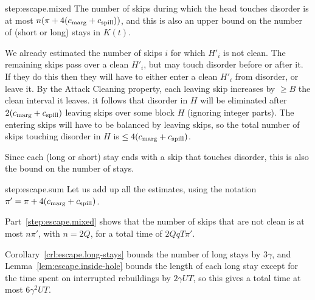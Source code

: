 \documentclass[11pt]{memoir}
\theoremstyle{definition} %
\renewcommand{\le}{\leq}
\renewcommand{\ge}{\geq}
\def\B{B}
\def\U{U}
\renewcommand{\d}{d}
\newcommand{\escno}{q}
\newcommand{\passno}{\pi}
\newcommand{\Q}{Q} %
\newcommand{\Tu}{T}
\newcommand{\cns}[1]{c_{\textrm{\upshape #1}}}
\newcommand{\CMarg}{\cns{marg}}
\newcommand{\CSpill}{\cns{spill}}
\begin{document}
\begin{Proof}

\begin{step+}{step:escape.mixed}
  The number of skips during which the head touches disorder is at most
  \( n(\passno + 4(\CMarg+\CSpill)) \), and this is also an upper bound on the
  number of (short or long) stays in \( K(t) \).
\end{step+}
\begin{pproof}
  We already estimated the number of skips \( i \) for which \( H'_{i} \)
  is not clean.
  The remaining skips pass over a clean \( H'_{i} \), but may touch disorder before
  or after it.
  If they do this then they will have to either enter a clean \( H'_{i} \) from disorder,
  or leave it.
  By the Attack Cleaning property, each leaving skip increases by \( \ge\B \) the clean interval
  it leaves.
  it follows that disorder in \( H \) will be eliminated after \( 2(\CMarg+\CSpill) \)
  leaving skips over some block \( H \) (ignoring integer parts).
  The entering skips will have to be balanced by leaving skips,
  so the total number of skips touching disorder in \( H \) is \( \le 4(\CMarg+\CSpill) \).

  Since each (long or short) stay ends with a skip that touches disorder, this is also the bound
  on the number of stays.
\end{pproof} %

\begin{step+}{step:escape.sum}
Let us add up all the estimates, using the notation \( \passno'=\passno+4(\CMarg+\CSpill) \).
\end{step+}
\begin{prooof}
  Part~\ref {step:escape.mixed} shows that the number of skips
  that are not clean is at most   \( n\passno' \), with \( n=2\Q \),
  for a total time of \(   2\Q\escno\Tu\passno' \).
  
  Corollary~\ref{crl:escape.long-stays} bounds the number of long stays by \( 3\gamma \),
  and Lemma~\ref{lem:escape.inside-hole} bounds the length
  of each long stay except for the time spent on interrupted rebuildings 
  by \( 2 \gamma\U\Tu \), so this gives a total time at most \(  6\gamma^{2}\U\Tu \).


\end{prooof}
\end{Proof}
\end{document}
